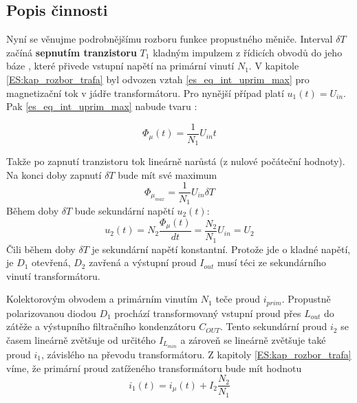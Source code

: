   \subsection{Popis činnosti}\label{ENZ:kap_forward_converter_describe}
    Nyní se věnujme podrobnějšímu rozboru funkce propustného měniče. Interval $\delta T$ začíná
    \textbf{sepnutím tranzistoru} $T_1$ kladným impulzem z řídicích obvodů do jeho báze     
    \cite[s.~131]{Hammembauer}, které přivede vstupní napětí na primární vinutí $N_1$. V kapitole
    \ref{ES:kap_rozbor_trafa} byl odvozen vztah \ref{es_eq_int_uprim_max} pro magnetizační tok v 
    jádře transformátoru. Pro nynější případ platí $u_1(t) = U_{in}$. Pak 
    \ref{es_eq_int_uprim_max} nabude tvaru 
    \cite[s.~104]{Patocka}:
    
    \begin{equation}\label{ENZ:eq_forward_phi_mag}
     \Phi_\mu(t)=\frac{1}{N_1}U_{in}t
    \end{equation}
    
    Takže po zapnutí tranzistoru tok lineárně narůstá (z nulové počáteční hodnoty). Na konci doby 
    zapnutí $\delta T$ bude mít své maximum 
    \begin{equation}\label{ENZ:eq_forward_phi_max}
     \Phi_{\mu_{max}}=\frac{1}{N_1}U_{in}\delta T
    \end{equation}
    Během doby $\delta T$ bude sekundární napětí $u_{2}(t)$:
    \begin{equation}\label{ENZ:eq_forward_usec}
     u_{2}(t) = N_2\frac{\Phi_\mu(t)}{dt} = \frac{N_2}{N_1}U_{in} = U_{2}
    \end{equation}
    Čili během doby $\delta T$ je sekundární napětí konstantní. Protože jde o kladné napětí, je 
    $D_1$ otevřená, $D_2$ zavřená a výstupní proud $I_{out}$ musí téci ze sekundárního vinutí 
    transformátoru.
    
    Kolektorovým obvodem a primárním vinutím $N_1$ teče proud $i_{prim}$. Propustně polarizovanou 
    diodou $D_1$ prochází transformovaný vstupní proud přes $L_{out}$ do zátěže a výstupního 
    filtračního kondenzátoru $C_{OUT}$. Tento sekundární proud $i_2$ se časem lineárně zvětšuje  
    od určitého $I_{L_{min}}$ a zároveň se lineárně zvětšuje také proud $i_1$, závislého na 
    převodu transformátoru. Z kapitoly \ref{ES:kap_rozbor_trafa} víme, že primární proud 
    zatíženého transformátoru bude mít hodnotu
    \begin{equation}\label{ENZ:eq_forward_iprim}
    i_1(t) = i_\mu(t) + I_2\frac{N_2}{N_1}
    \end{equation} 
    
